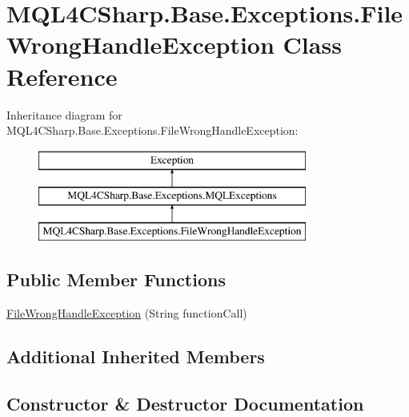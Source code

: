 \hypertarget{class_m_q_l4_c_sharp_1_1_base_1_1_exceptions_1_1_file_wrong_handle_exception}{}\section{M\+Q\+L4\+C\+Sharp.\+Base.\+Exceptions.\+File\+Wrong\+Handle\+Exception Class Reference}
\label{class_m_q_l4_c_sharp_1_1_base_1_1_exceptions_1_1_file_wrong_handle_exception}
Inheritance diagram for M\+Q\+L4\+C\+Sharp.\+Base.\+Exceptions.\+File\+Wrong\+Handle\+Exception\+:\begin{figure}[H]
\begin{center}
\leavevmode
\includegraphics[height=3.000000cm]{class_m_q_l4_c_sharp_1_1_base_1_1_exceptions_1_1_file_wrong_handle_exception}
\end{center}
\end{figure}
\subsection*{Public Member Functions}
\begin{DoxyCompactItemize}
\item 
\hyperlink{class_m_q_l4_c_sharp_1_1_base_1_1_exceptions_1_1_file_wrong_handle_exception_ab7d13965f1927b9f64e53c614e49b076}{File\+Wrong\+Handle\+Exception} (String function\+Call)
\end{DoxyCompactItemize}
\subsection*{Additional Inherited Members}


\subsection{Constructor \& Destructor Documentation}
